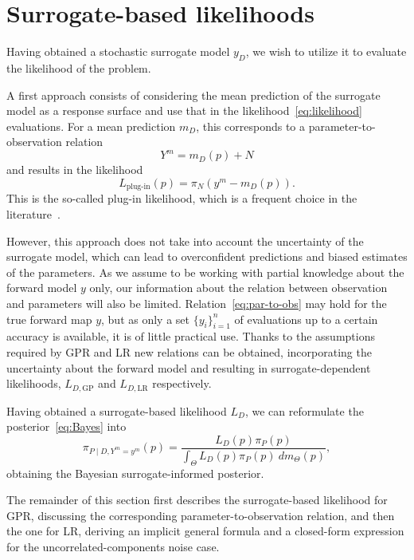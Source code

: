 \section{Surrogate-based likelihoods}\label{sec:likelihoods}

Having obtained a stochastic surrogate model $y_D$, we wish to utilize it to evaluate the likelihood of the problem.

A first approach consists of considering the mean prediction of the surrogate model as a response surface and use that in the likelihood~\eqref{eq:likelihood} evaluations. 
For a mean prediction $m_D$, this corresponds to a parameter-to-observation relation 
\begin{equation}\label{eq:plug-in-par-to-obs}
    Y^m = m_D(p) + N
\end{equation}
and results in the likelihood
\begin{equation}\label{eq:plug-in-likelihood}
    L_{\text{plug-in}}(p) = \pi_N(y^m - m_D(p)).
\end{equation}
This is the so-called plug-in likelihood, which is a frequent choice in the literature~\cite{SinsbeckNowak2017}. 

However, this approach does not take into account the uncertainty of the surrogate model, which can lead to overconfident predictions and biased estimates of the parameters.
As we assume to be working with partial knowledge about the forward model $y$ only, our information about the relation between observation and parameters will also be limited. 
Relation~\eqref{eq:par-to-obs} may hold for the true forward map $y$, but as only a set $\{y_i\}_{i=1}^n$ of evaluations up to a certain accuracy is available, it is of little practical use. 
Thanks to the assumptions required by GPR and LR new relations can be obtained, incorporating the uncertainty about the forward model and resulting in surrogate-dependent likelihoods, $L_{D, \text{GP}}$ and $L_{D, \text{LR}}$ respectively. 

Having obtained a surrogate-based likelihood $L_D$, we can reformulate the posterior~\eqref{eq:Bayes} into 
\begin{equation} \label{eq:surr-posterior}
    \pi_{P\mid D, Y^m = y^m}(p) = \frac{L_D(p) \pi_P(p)}{\int_\Theta  L_D(p) \pi_P(p) \ dm_\Theta(p)},
\end{equation}
obtaining the Bayesian surrogate-informed posterior.

The remainder of this section first describes the surrogate-based likelihood for GPR, discussing the corresponding parameter-to-observation relation, and then the one for LR, deriving an implicit general formula and a closed-form expression for the uncorrelated-components noise case.

